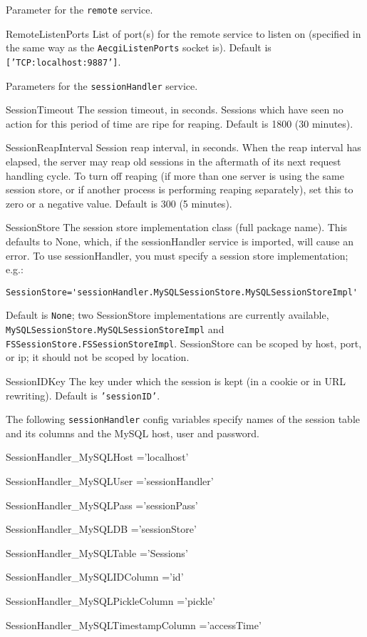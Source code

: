 \documentclass[titlepage]{manual}
\begin{document}
Parameter for the \texttt{remote} service.
\begin{argdesc}
\item[RemoteListenPorts] \nonscope
List of port(s) for the remote service to listen on (specified in the same
way as the \texttt{AecgiListenPorts} socket is).  
Default is \texttt{['TCP:localhost:9887']}.
\end{argdesc}



Parameters for the \texttt{sessionHandler} service.
\begin{argdesc}
\item[SessionTimeout] 
The session timeout, in seconds.  Sessions which have seen no action
for this period of time are ripe for reaping.
Default is 1800 (30 minutes).
\item[SessionReapInterval] \nonscope
Session reap interval, in seconds.  When the reap interval has elapsed,
the server may reap old sessions in the aftermath of its next
request handling cycle.  To turn off reaping (if more than one
server is using the same session store, or if another process
is performing reaping separately), set this to zero or a negative
value.
Default is 300 (5 minutes).
\item[SessionStore] 
The session store implementation class (full package name). This
defaults to None, which, if the sessionHandler service is imported,
will cause an error.  To use sessionHandler, you must specify a session
store implementation; e.g.:
\begin{verbatim} 
SessionStore='sessionHandler.MySQLSessionStore.MySQLSessionStoreImpl'
\end{verbatim}
Default is \texttt{None}; two SessionStore implementations are currently 
available, \texttt{MySQLSessionStore.MySQLSessionStoreImpl} and 
\texttt{FSSessionStore.FSSessionStoreImpl}.  SessionStore can be scoped 
by host, port, or ip; it should not be scoped by location.
\item[SessionIDKey] \nonscope
The key under which the session is kept (in a cookie or in URL rewriting).
Default is \texttt{'sessionID'}.
\end{argdesc}
The following \texttt{sessionHandler} config variables specify names
of the session table and its columns and the MySQL host, user and password.
\begin{argdesc}
\item[SessionHandler_MySQLHost]='localhost' \nonscope
\item[SessionHandler_MySQLUser]='sessionHandler' \nonscope
\item[SessionHandler_MySQLPass]='sessionPass' \nonscope
\item[SessionHandler_MySQLDB]='sessionStore' \nonscope
\item[SessionHandler_MySQLTable]='Sessions' \nonscope
\item[SessionHandler_MySQLIDColumn]='id' \nonscope
\item[SessionHandler_MySQLPickleColumn]='pickle' \nonscope
\item[SessionHandler_MySQLTimestampColumn]='accessTime' \nonscope
\end{argdesc}
\end{document}
